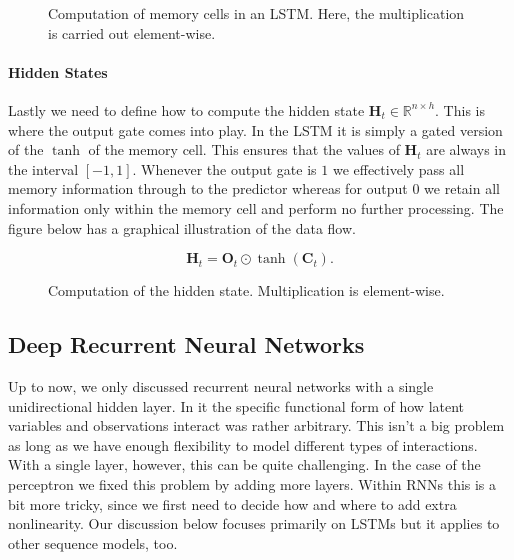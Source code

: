 \begin{figure}[hpt]
	\centering
	
	\caption{Computation of memory cells in an LSTM. Here, the multiplication is carried out element-wise.}
	\label{fig:lstm_2}
\end{figure}

\paragraph{Hidden States}

Lastly we need to define how to compute the hidden state $\mathbf{H}_t \in \mathbb{R}^{n \times h}$. This is where the output gate comes into play. In the LSTM it is simply a gated version of the $\tanh$ of the memory cell. This ensures that the values of $\mathbf{H}_t$ are always in the interval $[-1, 1]$. Whenever the output gate is $1$ we effectively pass all memory information through to the predictor whereas for output $0$ we retain all information only within the memory cell and perform no further processing. The figure below has a graphical illustration of the data flow.

$$\mathbf{H}_t = \mathbf{O}_t \odot \tanh(\mathbf{C}_t).$$

\begin{figure}[hpt]
	\centering
	
	\caption{Computation of the hidden state. Multiplication is element-wise.}
	\label{fig:lstm_3}
\end{figure}

\subsection{Deep Recurrent Neural Networks}

Up to now, we only discussed recurrent neural networks with a single unidirectional hidden layer. In it the specific functional form of how latent variables and observations interact was rather arbitrary. This isn't a big problem as long as we have enough flexibility to model different types of interactions. With a single layer, however, this can be quite challenging. In the case of the perceptron we fixed this problem by adding more layers. Within RNNs this is a bit more tricky, since we first need to decide how and where to add extra nonlinearity. Our discussion below focuses primarily on LSTMs but it applies to other sequence models, too.

